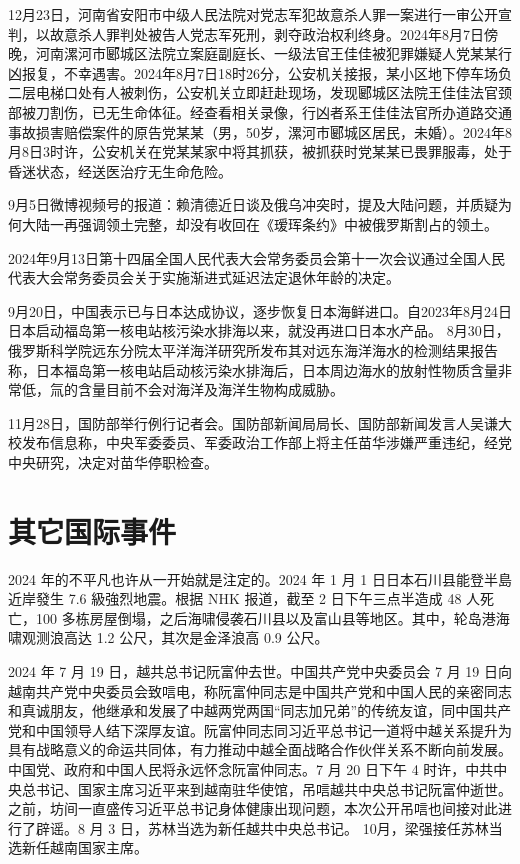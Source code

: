 12月23日，河南省安阳市中级人民法院对党志军犯故意杀人罪一案进行一审公开宣判，以故意杀人罪判处被告人党志军死刑，剥夺政治权利终身。2024年8月7日傍晚，河南漯河市郾城区法院立案庭副庭长、一级法官王佳佳被犯罪嫌疑人党某某行凶报复，不幸遇害。2024年8月7日18时26分，公安机关接报，某小区地下停车场负二层电梯口处有人被刺伤，公安机关立即赶赴现场，发现郾城区法院王佳佳法官颈部被刀割伤，已无生命体征。经查看相关录像，行凶者系王佳佳法官所办道路交通事故损害赔偿案件的原告党某某（男，50岁，漯河市郾城区居民，未婚）。2024年8月8日3时许，公安机关在党某某家中将其抓获，被抓获时党某某已畏罪服毒，处于昏迷状态，经送医治疗无生命危险。

9月5日微博视频号的报道：赖清德近日谈及俄乌冲突时，提及大陆问题，并质疑为何大陆一再强调领土完整，却没有收回在《瑷珲条约》中被俄罗斯割占的领土。

2024年9月13日第十四届全国人民代表大会常务委员会第十一次会议通过全国人民代表大会常务委员会关于实施渐进式延迟法定退休年龄的决定。

9月20日，中国表示已与日本达成协议，逐步恢复日本海鲜进口。自2023年8月24日日本启动福岛第一核电站核污染水排海以来，就没再进口日本水产品。 8月30日，俄罗斯科学院远东分院太平洋海洋研究所发布其对远东海洋海水的检测结果报告称，日本福岛第一核电站启动核污染水排海后，日本周边海水的放射性物质含量非常低，氚的含量目前不会对海洋及海洋生物构成威胁。

11月28日，国防部举行例行记者会。国防部新闻局局长、国防部新闻发言人吴谦大校发布信息称，中央军委委员、军委政治工作部上将主任苗华涉嫌严重违纪，经党中央研究，决定对苗华停职检查。

\section{其它国际事件}

2024 年的不平凡也许从一开始就是注定的。2024 年 1 月 1 日日本石川县能登半島近岸發生 7.6 級強烈地震。根据 NHK 报道，截至 2 日下午三点半造成 48 人死亡，100 多栋房屋倒塌，之后海啸侵袭石川县以及富山县等地区。其中，轮岛港海啸观测浪高达 1.2 公尺，其次是金泽浪高 0.9 公尺。

2024 年 7 月 19 日，越共总书记阮富仲去世。中国共产党中央委员会 7 月 19 日向越南共产党中央委员会致唁电，称阮富仲同志是中国共产党和中国人民的亲密同志和真诚朋友，他继承和发展了中越两党两国“同志加兄弟”的传统友谊，同中国共产党和中国领导人结下深厚友谊。阮富仲同志同习近平总书记一道将中越关系提升为具有战略意义的命运共同体，有力推动中越全面战略合作伙伴关系不断向前发展。中国党、政府和中国人民将永远怀念阮富仲同志。7 月 20 日下午 4 时许，中共中央总书记、国家主席习近平来到越南驻华使馆，吊唁越共中央总书记阮富仲逝世。之前，坊间一直盛传习近平总书记身体健康出现问题，本次公开吊唁也间接对此进行了辟谣。8 月 3 日，苏林当选为新任越共中央总书记。 10月，梁强接任苏林当选新任越南国家主席。

